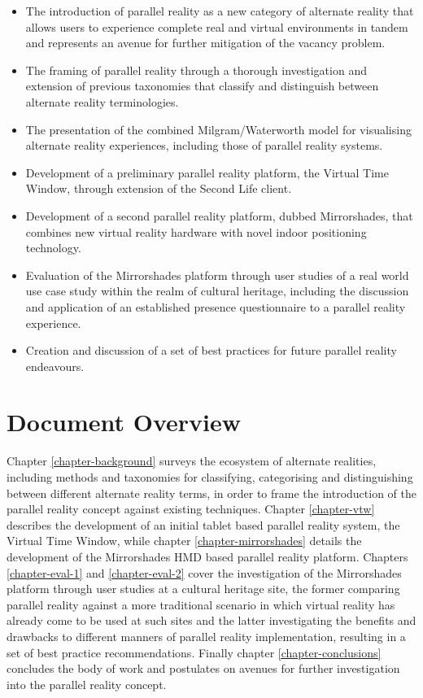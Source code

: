 \begin{itemize}
	\item The introduction of parallel reality as a new category of alternate reality that allows users to experience complete real and virtual environments in tandem and represents an avenue for further mitigation of the vacancy problem.
	\item The framing of parallel reality through a thorough investigation and extension of previous taxonomies that classify and distinguish between alternate reality terminologies.
	\item The presentation of the combined Milgram/Waterworth model for visualising alternate reality experiences, including those of parallel reality systems.
	\item Development of a preliminary parallel reality platform, the Virtual Time Window, through extension of the Second Life client.
	\item Development of a second parallel reality platform, dubbed Mirrorshades, that combines new virtual reality hardware with novel indoor positioning technology.
	\item Evaluation of the Mirrorshades platform through user studies of a real world use case study within the realm of cultural heritage, including the discussion and application of an established presence questionnaire to a parallel reality experience.
	\item Creation and discussion of a set of best practices for future parallel reality endeavours.
\end{itemize}


\section{Document Overview}

Chapter \ref{chapter-background} surveys the ecosystem of alternate realities, including methods and taxonomies for classifying, categorising and distinguishing between different alternate reality terms, in order to frame the introduction of the parallel reality concept against existing techniques. Chapter \ref{chapter-vtw} describes the development of an initial tablet based parallel reality system, the Virtual Time Window, while chapter \ref{chapter-mirrorshades} details the development of the Mirrorshades HMD based parallel reality platform. Chapters \ref{chapter-eval-1} and \ref{chapter-eval-2} cover the investigation of the Mirrorshades platform through user studies at a cultural heritage site, the former comparing parallel reality against a more traditional scenario in which virtual reality has already come to be used at such sites and the latter investigating the benefits and drawbacks to different manners of parallel reality implementation, resulting in a set of best practice recommendations. Finally chapter \ref{chapter-conclusions} concludes the body of work and postulates on avenues for further investigation into the parallel reality concept.


